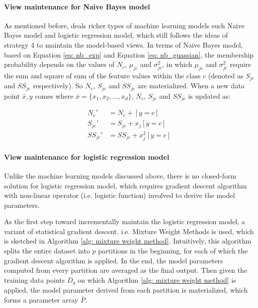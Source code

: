 \paragraph{View maintenance for Naive Bayes model}
As mentioned before, \cite{gupta2015processing} deals richer types of machine learning models such Naive Bayes model and logistic regression model, which still follows the ideas of strategy 4 to maintain the model-based views. In terms of Naive Bayes model, based on Equation \ref{eq: nb_exp} and Equation \ref{eq: nb_guassian}, the membership probability depends on the values of $N_c$, $\mu_{jc}$ and $\sigma_{jc}^2$, in which $\mu_{jc}$ and $\sigma_{jc}^2$ require the sum and square of sum of the feature values within the class $c$ (denoted as $S_{jc}$ and $SS_{jc}$ respectively). So $N_c$, $S_{jc}$ and $SS_{jc}$ are materialized. When a new data point $\bar{x}, y$ comes where $\bar{x} = \{x_1, x_2, \dots, x_d\}$, $N_c$, $S_{jc}$ and $SS_{jc}$ is updated as:

\begin{equation}
    \begin{split}
        N_c' &= N_c + [y=c]\\
        S_{jc}' &= S_{jc} + x_j[y=c]\\
        SS_{jc}'&= SS_{jc} + x_j^2[y=c]
    \end{split}
\end{equation}

\paragraph{View maintenance for logistic regression model}
Unlike the machine learning models discussed above, there is no closed-form solution for logistic regression model, which requires gradient descent algorithm with non-linear operator (i.e. logistic function) involved to derive the model parameters. 

As the first step toward incrementally maintain the logistic regression model, a variant of statistical gradient descent, i.e. Mixture Weight Methods \cite{mcdonald2009efficient} is used, which is sketched in Algorithm \ref{alg: mixture weight method}. Intuitively, this algorithm splits the entire dataset into $p$ partitions in the beginning, for each of which the gradient descent algorithm is applied. In the end, the model parameters computed from every partition are averaged as the final output. Then given the training data points $D_q$ on which Algorithm \ref{alg: mixture weight method} is applied, the model parameter derived from each partition is materialized, which forms a parameter array $\bar{P}$. 


